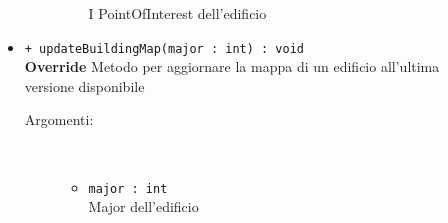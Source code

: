 \documentclass[../DefinizioneDiProdotto.tex]{subfiles}
\begin{document}
\begin{description}
\begin{itemize}
\begin{description}
\begin{itemize}
				I PointOfInterest dell'edificio\end{itemize}
		\end{description}
		\item \texttt{+ updateBuildingMap(major : int) : void}\\
		\textbf{Override} Metodo per aggiornare la mappa di un edificio all'ultima versione disponibile
		\begin{description}
			\item[Argomenti:] \
			\begin{itemize}
				\item \texttt{major : int}\\
				Major dell'edificio\end{itemize}
		\end{description}
	\end{itemize}
\end{description}
\end{document}
